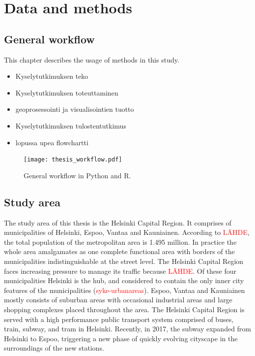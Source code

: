 \section{Data and methods}
\subsection{General workflow}
\justify
This chapter describes the usage of methods in this study.

\begin{itemize}
    \item Kyselytutkimuksen teko
    \item Kyselytutkimuksen toteuttaminen
    \item geoprosessointi ja visualisointien tuotto
    \item Kyselytutkimuksen tulostentutkimus
    \item lopussa upea flowchartti
\end{itemize}

\begin{figure}[H]
    \centering
    \texttt{[image: thesis\_workflow.pdf]}
    \caption{General workflow in Python and R.} 
    \label{fig:gen_workflow}
\end{figure}

\subsection{Study area}
\justify
The study area of this thesis is the Helsinki Capital Region. It comprises of municipalities of Helsinki, Espoo, Vantaa and Kauniainen. According to \textcolor{red}{LÄHDE}, the total population of the metropolitan area is 1.495 million. In practice the whole area amalgamates as one complete functional area with borders of the municipalities indistinguishable at the street level. The Helsinki Capital Region faces increasing pressure to manage its traffic because \textcolor{red}{LÄHDE}. Of these four municipalities Helsinki is the hub, and considered to contain the only inner city features of the municipalities (\textcolor{red}{syke-urbanareas}). Espoo, Vantaa and Kauniainen mostly consists of suburban areas with occasional industrial areas and large shopping complexes placed throughout the area. The Helsinki Capital Region is served with a high performance public transport system comprised of buses, train, subway, and tram in Helsinki. Recently, in 2017, the subway expanded from Helsinki to Espoo, triggering a new phase of quickly evolving cityscape in the surroundings of the new stations.

